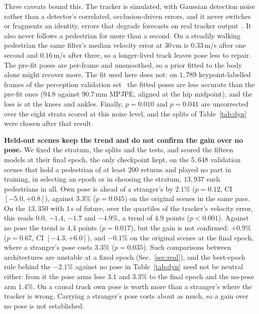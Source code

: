 \documentclass[conference]{IEEEtran}
\begin{document}
Three caveats bound this. The tracker is simulated, with Gaussian detection
noise rather than a detector's correlated, occlusion-driven errors, and it
never switches or fragments an identity, errors that degrade forecasts on real
tracker output~\cite{weng2022mtp}. It also never follows a pedestrian for more
than a second. On a steadily walking pedestrian the same filter's median
velocity error at $30$\,cm is $0.33$\,m/s after one second and $0.16$\,m/s
after three, so a longer-lived track leaves pose less to repair. The pre-fit
poses are per-frame and unsmoothed, so a prior fitted to the body alone might
recover more. The fit used here does not: on $1{,}789$ keypoint-labelled frames
of the perception validation
set~\cite{sun2020waymoperception,zheng2022keypoints} the fitted poses are less
accurate than the pre-fit ones ($94.8$ against $90.7$\,mm MPJPE, aligned at the
hip midpoint), and the loss is at the knees and ankles.
Finally, $p{=}0.010$ and $p{=}0.041$ are uncorrected over the eight strata scored at this
noise level, and the splits of Table~\ref{tab:dyn} were chosen after that
result.

\textbf{Held-out scenes keep the trend and do not confirm the gain over no
pose.} We fixed the stratum, the splits and the tests, and scored the fifteen
models at their final epoch, the only checkpoint kept, on the $5{,}648$ validation
scenes that hold a pedestrian of at least $200$ returns and played no part in
training, in selecting an epoch or in choosing the stratum, $13{,}937$ such
pedestrians in all. Own pose is ahead of a stranger's by $2.1\%$ ($p{=}0.12$, CI
$[-5.0,+0.8]$), against $3.3\%$ ($p{=}0.045$) on the original scenes in the
same pass. On the $13{,}350$ with $1$\,s of future, over the quartiles of the
tracker's velocity error, this reads
$0.0$, $-1.4$, $-1.7$ and $-4.9\%$, a trend of $4.9$ points ($p{<}0.001$).
Against no pose the trend is $4.4$ points ($p{=}0.017$), but the gain is not
confirmed: $+0.9\%$ ($p{=}0.67$, CI $[-4.3,+6.0]$), and $-0.1\%$ on the
original scenes at the final epoch, where a stranger's pose costs $3.3\%$
($p{=}0.035$). Such comparisons between architectures are unstable at a fixed
epoch (Sec.~\ref{sec:real}), and the best-epoch rule behind the $-2.1\%$ against no pose in
Table~\ref{tab:dyn} need not be neutral either: from it the pose arms lose
$3.1$ and $3.3\%$ to the final epoch and the no-pose arm $1.4\%$. On a causal track
own pose is worth more than a stranger's where the tracker is wrong. Carrying
a stranger's pose costs about as much, so a gain over no pose is not
established.
\end{document}
